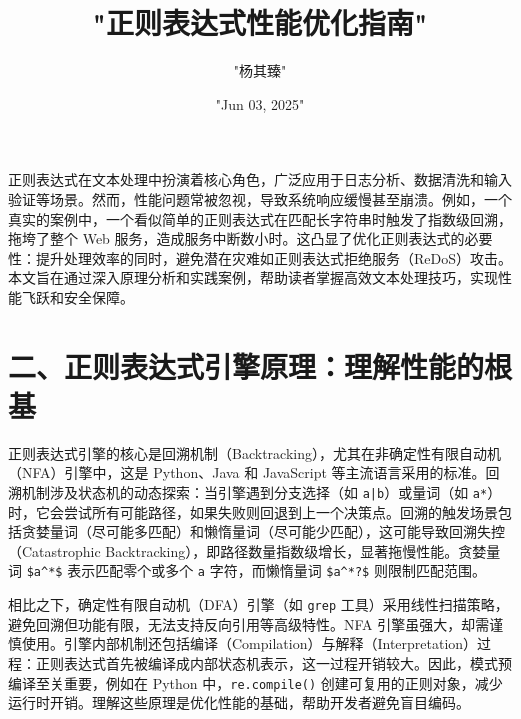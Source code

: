 \title{"正则表达式性能优化指南"}
\author{"杨其臻"}
\date{"Jun 03, 2025"}
\maketitle
正则表达式在文本处理中扮演着核心角色，广泛应用于日志分析、数据清洗和输入验证等场景。然而，性能问题常被忽视，导致系统响应缓慢甚至崩溃。例如，一个真实的案例中，一个看似简单的正则表达式在匹配长字符串时触发了指数级回溯，拖垮了整个 Web 服务，造成服务中断数小时。这凸显了优化正则表达式的必要性：提升处理效率的同时，避免潜在灾难如正则表达式拒绝服务（ReDoS）攻击。本文旨在通过深入原理分析和实践案例，帮助读者掌握高效文本处理技巧，实现性能飞跃和安全保障。\par
\chapter{二、正则表达式引擎原理：理解性能的根基}
正则表达式引擎的核心是回溯机制（Backtracking），尤其在非确定性有限自动机（NFA）引擎中，这是 Python、Java 和 JavaScript 等主流语言采用的标准。回溯机制涉及状态机的动态探索：当引擎遇到分支选择（如 \verb!a|b!）或量词（如 \verb!a*!）时，它会尝试所有可能路径，如果失败则回退到上一个决策点。回溯的触发场景包括贪婪量词（尽可能多匹配）和懒惰量词（尽可能少匹配），这可能导致回溯失控（Catastrophic Backtracking），即路径数量指数级增长，显著拖慢性能。贪婪量词 \verb!$a^*$! 表示匹配零个或多个 \verb!a! 字符，而懒惰量词 \verb!$a^*?$! 则限制匹配范围。\par
相比之下，确定性有限自动机（DFA）引擎（如 \verb!grep! 工具）采用线性扫描策略，避免回溯但功能有限，无法支持反向引用等高级特性。NFA 引擎虽强大，却需谨慎使用。引擎内部机制还包括编译（Compilation）与解释（Interpretation）过程：正则表达式首先被编译成内部状态机表示，这一过程开销较大。因此，模式预编译至关重要，例如在 Python 中，\verb!re.compile()! 创建可复用的正则对象，减少运行时开销。理解这些原理是优化性能的基础，帮助开发者避免盲目编码。\par
